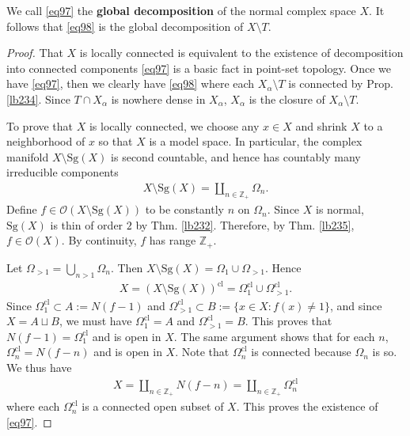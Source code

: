\documentclass[12pt,b5paper,notitlepage]{report}
\theoremstyle{definition}
\theoremstyle{plain}
\newcommand{\scr}{\mathscr}
\newcommand{\Zbb}{\mathbb Z}
\newcommand{\cl}{\mathrm{cl}}
\newcommand{\Sg}{\mathrm{Sg}}
\numberwithin{equation}{section}
\begin{document}
We call \eqref{eq97} the \textbf{global decomposition}  of the normal complex space $X$. It follows that \eqref{eq98} is the global decomposition of $X\setminus T$.

\begin{proof}
That $X$ is locally connected is equivalent to the existence of decomposition into connected components \eqref{eq97} is a basic fact in point-set topology. Once we have \eqref{eq97}, then we clearly have \eqref{eq98} where each $X_\alpha\setminus T$ is connected by Prop. \ref{lb234}. Since $ T\cap X_\alpha$ is nowhere dense in $X_\alpha$, $X_\alpha$ is the closure of $X_\alpha\setminus T$.

To prove that $X$ is locally connected, we choose any $x\in X$ and shrink $X$ to a neighborhood of $x$ so that $X$ is a model space. In particular, the complex manifold $X\setminus\Sg(X)$ is second countable, and hence has countably many irreducible components
\begin{align*}
X\setminus\Sg(X)=\coprod_{n\in\Zbb_+}\Omega_n.
\end{align*}
Define $f\in\scr O(X\setminus\Sg(X))$ to be constantly $n$ on $\Omega_n$. Since $X$ is normal, $\Sg(X)$ is thin of order $2$ by Thm. \ref{lb232}. Therefore, by Thm. \ref{lb235}, $f\in\scr O(X)$. By continuity, $f$ has range $\Zbb_+$.

Let $\Omega_{>1}=\bigcup_{n>1}\Omega_n$. Then $X\setminus\Sg(X)=\Omega_1\cup \Omega_{>1}$. Hence
\begin{align*}
X=(X\setminus\Sg(X))^\cl=\Omega_1^\cl\cup \Omega_{>1}^\cl.
\end{align*}
Since $\Omega_1^\cl\subset A:=N(f-1)$ and $\Omega_{>1}^\cl\subset B:=\{x\in X:f(x)\neq 1\}$, and since $X=A\sqcup B$, we must have $\Omega_1^\cl=A$ and $\Omega_{>1}^\cl=B$. This proves that $N(f-1)=\Omega_1^\cl$ and is open in $X$. The same argument shows that for each $n$, $\Omega_n^\cl=N(f-n)$ and is open in $X$. Note that $\Omega_n^\cl$ is connected because $\Omega_n$ is so. We thus have
\begin{align*}
X=\coprod_{n\in\Zbb_+} N(f-n)=\coprod_{n\in\Zbb_+}\Omega_n^\cl
\end{align*}
where each $\Omega_n^\cl$ is a connected open subset of $X$. This proves the existence of \eqref{eq97}.
\end{proof}
\end{document}
